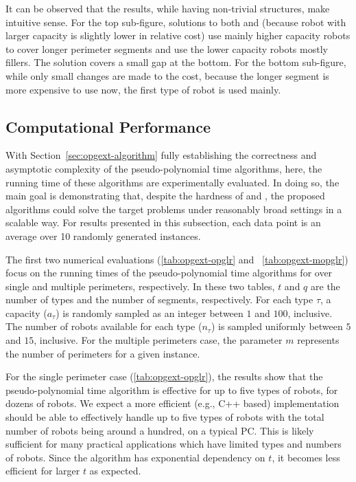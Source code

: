 It can be observed that the results, while having non-trivial structures, 
make intuitive sense. For the top sub-figure, solutions to both \opglr 
and \opgmc (because robot with larger capacity is slightly lower in 
relative cost) use mainly higher capacity robots to cover longer perimeter 
segments and use the lower capacity robots mostly fillers. The solution 
covers a small gap at the bottom. For the bottom sub-figure, while only 
small changes are made to the cost, because the longer segment is more 
expensive to use now, the first type of robot is used mainly. 

\subsection{Computational Performance}
With Section~\ref{sec:opgext-algorithm} fully establishing the correctness and 
asymptotic complexity of the pseudo-polynomial time algorithms, here, the 
running time of these algorithms are experimentally evaluated. In doing 
so, the main goal is demonstrating that, despite the hardness of \opglr 
and \opgmc, the proposed algorithms could solve the target problems under 
reasonably broad settings in a scalable way. For results presented in 
this subsection, each data point is an average over 10 randomly generated 
instances. 

The first two numerical evaluations (\ref{tab:opgext-opglr} and 
~\ref{tab:opgext-mopglr}) focus on the running times of the pseudo-polynomial 
time algorithms for \opglr over single and multiple perimeters, 
respectively. In these two tables, $t$ and $q$ are the number of types 
and the number of segments, respectively. For each type $\tau$, a 
capacity ($a_{\tau}$) is randomly sampled as an integer between $1$ and 
$100$, inclusive. The number of robots available for each type ($n_{\tau}$) 
is sampled uniformly between $5$ and $15$, inclusive. For the multiple 
perimeters case, the parameter $m$ represents the number of perimeters for 
a given instance.

For the single perimeter case (\ref{tab:opgext-opglr}), the results show 
that the pseudo-polynomial time algorithm is effective for up to five 
types of robots, for dozens of robots. We expect a more efficient 
(e.g., C++ based) implementation should be able to effectively handle 
up to five types of robots with the total number of robots being around 
a hundred, on a typical PC. This is likely sufficient for many practical 
applications which have limited types and numbers of robots. Since the 
algorithm has exponential dependency on $t$, it becomes less efficient 
for larger $t$ as expected.  

